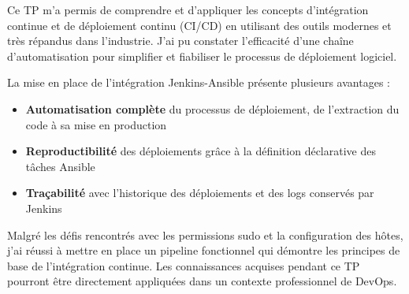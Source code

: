 \documentclass{article}
\begin{document}
Ce TP m'a permis de comprendre et d'appliquer les concepts d'intégration continue et de déploiement continu (CI/CD) en utilisant des outils modernes et très répandus dans l'industrie. J'ai pu constater l'efficacité d'une chaîne d'automatisation pour simplifier et fiabiliser le processus de déploiement logiciel.

La mise en place de l'intégration Jenkins-Ansible présente plusieurs avantages :
\begin{itemize}
    \item \textbf{Automatisation complète} du processus de déploiement, de l'extraction du code à sa mise en production
    \item \textbf{Reproductibilité} des déploiements grâce à la définition déclarative des tâches Ansible
    \item \textbf{Traçabilité} avec l'historique des déploiements et des logs conservés par Jenkins
\end{itemize}

Malgré les défis rencontrés avec les permissions sudo et la configuration des hôtes, j'ai réussi à mettre en place un pipeline fonctionnel qui démontre les principes de base de l'intégration continue. Les connaissances acquises pendant ce TP pourront être directement appliquées dans un contexte professionnel de DevOps.
\end{document}
